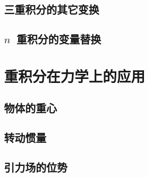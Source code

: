 \subsection{三重积分的其它变换}
\subsection{$n$~重积分的变量替换}
\begin{exercise}
\item
\end{exercise}
\section{重积分在力学上的应用}
\subsection{物体的重心}
\subsection{转动惯量}
\subsection{引力场的位势}
\begin{exercise}
\item
\end{exercise}
\begin{exercise*}
\item
\end{exercise*}




\endinput
